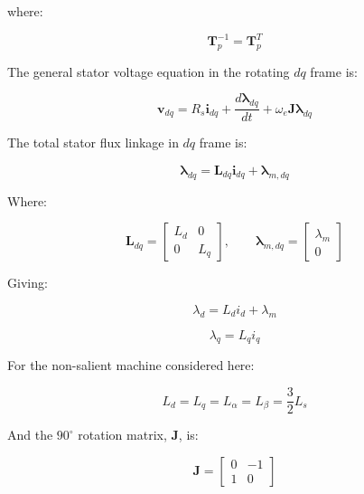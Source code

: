 \documentclass{article}
\begin{document}
where:

\begin{equation}
    \mathbf{T}_p^{-1}
    =
    \mathbf{T}_p^T
\end{equation}

The general stator voltage equation in the rotating $dq$ frame is:

\begin{equation}
    \mathbf{v}_{dq} = R_s\mathbf{i}_{dq} + \frac{d\boldsymbol{\lambda}_{dq}}{dt} + \omega_e\mathbf{J}\boldsymbol{\lambda}_{dq}
\end{equation}

The total stator flux linkage in $dq$ frame is:

\begin{equation}
    \boldsymbol{\lambda}_{dq} = \mathbf{L}_{dq}\mathbf{i}_{dq} + \boldsymbol{\lambda}_{m,dq}
\end{equation}

Where:

\begin{equation}
    \mathbf{L}_{dq} =
    \begin{bmatrix}
        L_d & 0 \\
        0 & L_q 
    \end{bmatrix},
    \qquad
    \boldsymbol{\lambda}_{m,dq} = 
    \begin{bmatrix}
        \lambda_{m} \\
        0
    \end{bmatrix}
\end{equation}

Giving:

\begin{equation}
    \lambda_d = L_di_d + \lambda_m
\end{equation}

\begin{equation}
    \lambda_q = L_qi_q
\end{equation}

For the non-salient machine considered here:

\begin{equation}
    L_d = L_q = L_\alpha = L_\beta = \frac{3}{2}L_s
\end{equation}

And the $90^\circ$ rotation matrix, $\mathbf{J}$, is:

\begin{equation}
    \mathbf{J} =
    \begin{bmatrix}
        0 & -1 \\
        1 & 0
    \end{bmatrix}
\end{equation}
\end{document}
